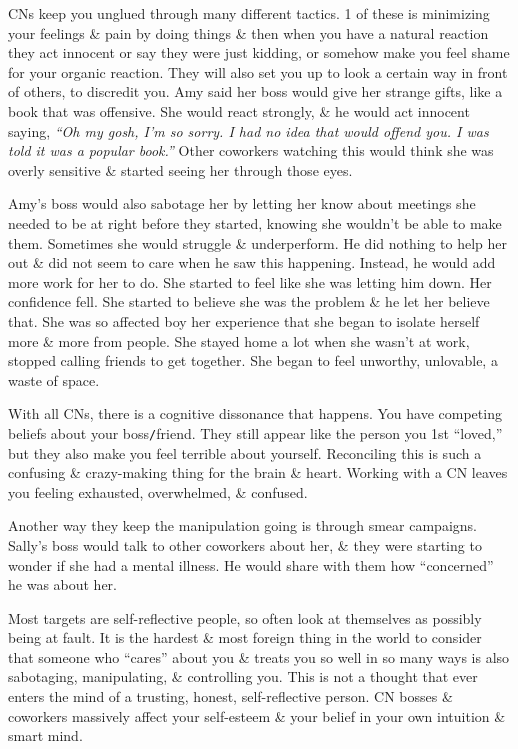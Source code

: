\documentclass{article}
\numberwithin{equation}{section}
\begin{document}
CNs keep you unglued through many different tactics. 1 of these is minimizing your feelings \& pain by doing things \& then when you have a natural reaction they act innocent or say they were just kidding, or somehow make you feel shame for your organic reaction. They will also set you up to look a certain way in front of others, to discredit you. Amy said her boss would give her strange gifts, like a book that was offensive. She would react strongly, \& he would act innocent saying, \textit{``Oh my gosh, I'm so sorry. I had no idea that would offend you. I was told it was a popular book.''} Other coworkers watching this would think she was overly sensitive \& started seeing her through those eyes.

Amy's boss would also sabotage her by letting her know about meetings she needed to be at right before they started, knowing she wouldn't be able to make them. Sometimes she would struggle \& underperform. He did nothing to help her out \& did not seem to care when he saw this happening. Instead, he would add more work for her to do. She started to feel like she was letting him down. Her confidence fell. She started to believe she was the problem \& he let her believe that. She was so affected boy her experience that she began to isolate herself more \& more from people. She stayed home a lot when she wasn't at work, stopped calling friends to get together. She began to feel unworthy, unlovable, a waste of space.

With all CNs, there is a cognitive dissonance that happens. You have competing beliefs about your boss\texttt{/}friend. They still appear like the person you 1st ``loved,'' but they also make you feel terrible about yourself. Reconciling this is such a confusing \& crazy-making thing for the brain \& heart. Working with a CN leaves you feeling exhausted, overwhelmed, \& confused.

Another way they keep the manipulation going is through smear campaigns. Sally's boss would talk to other coworkers about her, \& they were starting to wonder if she had a mental illness. He would share with them how ``concerned'' he was about her.

Most targets are self-reflective people, so often look at themselves as possibly being at fault. It is the hardest \& most foreign thing in the world to consider that someone who ``cares'' about you \& treats you so well in so many ways is also sabotaging, manipulating, \& controlling you. This is not a thought that ever enters the mind of a trusting, honest, self-reflective person. CN bosses \& coworkers massively affect your self-esteem \& your belief in your own intuition \& smart mind.
\end{document}
